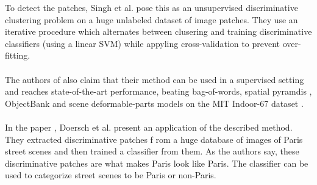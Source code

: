 To detect the patches, Singh et al. pose this as an unsupervised discriminative clustering problem on a huge unlabeled dataset of image patches.
They use an iterative procedure which alternates between clusering and training discriminative classifiers (using a linear SVM) while appyling 
cross-validation to prevent over-fitting.\\
\\
The authors of \cite{Singh2012DiscPat} also claim that their method can be used in a supervised setting and reaches state-of-the-art performance,
beating bag-of-words, spatial pyramdis \cite{Lazebnik2006SpatialPyr}, ObjectBank \cite{Li2010ObjectBank} and scene deformable-parts models \cite{Pandey2011PartBased} on the MIT Indoor-67 dataset \cite{MITIndoor}.\\
\\
In the paper \cite{doersch2012what}, Doersch et al. present an application of the described method. They extracted discriminative patches f
rom a huge database of images of Paris street scenes and then trained a classifier from them. As the authors say, these discriminative
patches are what makes Paris look like Paris. The classifier can be used to categorize street scenes to be Paris or non-Paris.